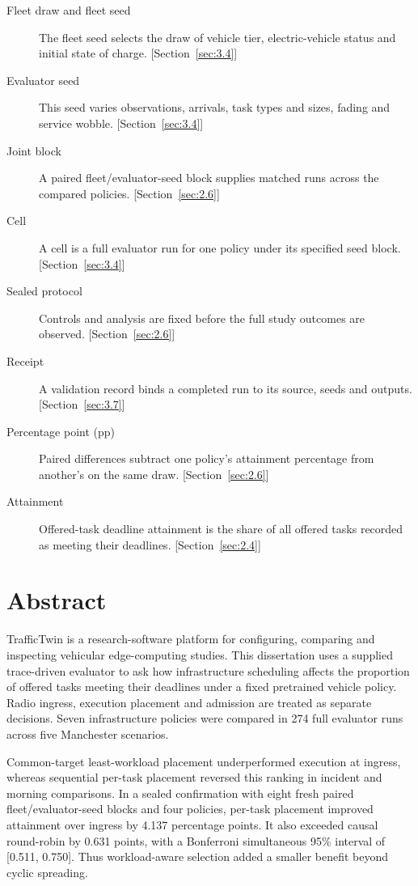 \documentclass[12pt,a4paper]{article}
\begin{document}
{\begin{description}
\item[Fleet draw and fleet seed] The fleet seed selects the draw of vehicle tier, electric-vehicle status and initial state of charge. [Section~\ref{sec:3.4}]
\item[Evaluator seed] This seed varies observations, arrivals, task types and sizes, fading and service wobble. [Section~\ref{sec:3.4}]
\item[Joint block] A paired fleet/evaluator-seed block supplies matched runs across the compared policies. [Section~\ref{sec:2.6}]
\item[Cell] A cell is a full evaluator run for one policy under its specified seed block. [Section~\ref{sec:3.4}]
\item[Sealed protocol] Controls and analysis are fixed before the full study outcomes are observed. [Section~\ref{sec:2.6}]
\item[Receipt] A validation record binds a completed run to its source, seeds and outputs. [Section~\ref{sec:3.7}]
\item[Percentage point (pp)] Paired differences subtract one policy's attainment percentage from another's on the same draw. [Section~\ref{sec:2.6}]
\item[Attainment] Offered-task deadline attainment is the share of all offered tasks recorded as meeting their deadlines. [Section~\ref{sec:2.4}]
\end{description}
}
\clearpage
\onehalfspacing\RaggedRight
\section*{Abstract}\label{sec:abstract}

TrafficTwin is a research-software platform for configuring, comparing and inspecting vehicular edge-computing studies. This dissertation uses a supplied trace-driven evaluator to ask how infrastructure scheduling affects the proportion of offered tasks meeting their deadlines under a fixed pretrained vehicle policy. Radio ingress, execution placement and admission are treated as separate decisions. Seven infrastructure policies were compared in 274 full evaluator runs across five Manchester scenarios.

Common-target least-workload placement underperformed execution at ingress, whereas sequential per-task placement reversed this ranking in incident and morning comparisons. In a sealed confirmation with eight fresh paired fleet/evaluator-seed blocks and four policies, per-task placement improved attainment over ingress by 4.137 percentage points. It also exceeded causal round-robin by 0.631 points, with a Bonferroni simultaneous 95\% interval of [0.511, 0.750]. Thus workload-aware selection added a smaller benefit beyond cyclic spreading.
\end{document}
